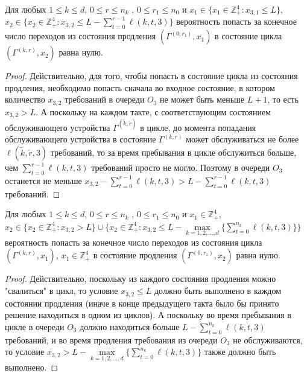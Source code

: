 \documentclass[a4paper,12pt,russian]{extarticle}
\begin{document}
\begin{lemma}
Для любых $1 \leqslant k \leqslant d$, $0 \leqslant r \leqslant n_k$ , $0 \leqslant r_1 \leqslant n_0$ и $x_1 \in \{x_1 \in \mathbb{Z}_+^4 \colon x_{3,1}\leqslant L\}$, $x_2 \in \{x_2 \in \mathbb{Z}_+^4 \colon x_{3,2} \leqslant L -\sum_{t=0}^{r-1} \ell(k,t,3)\}$ вероятность попасть за конечное число переходов из состояния продления $(\Gamma^{(0,r_1)},x_1)$ в состояние цикла $(\Gamma^{(k,r)},x_2)$ равна нулю.
\label{lemma:7}
\end{lemma}
\begin{proof}
Действительно, для того, чтобы попасть в состояние цикла из состояния продления, необходимо попасть сначала во входное состояние, в котором количество $x_{3,2}$ требований в очереди $O_3$ не может быть меньше $L+1$, то есть $x_{3,2} > L$. А поскольку на каждом такте, с соответствующим состоянием обслуживающего устройства $\Gamma^{(\tilde{k},\tilde{r})}$ в цикле, до момента попадания обслуживающего устройства в состояние $\Gamma^{(k,r)}$ может обслуживаться не более $\ell(\tilde{k},\tilde{r}, 3)$ требований, то за время пребывания в цикле обслужиться больше, чем $\sum_{t=0}^{r-1} \ell(k,t,3)$ требований просто не могло. Поэтому в очереди $O_3$ останется не меньше $x_{3,2} -\sum_{t=0}^{r-1} \ell(k,t,3)> L - \sum_{t=0}^{r-1} \ell(k,t,3)$ требований.
\end{proof}

\begin{lemma}
Для любых $1 \leqslant k \leqslant d$, $0 \leqslant r \leqslant n_k$ , $0 \leqslant r_1 \leqslant n_0$ и $x_1 \in \mathbb{Z}_+^4$,  $x_2 \in \{x_2 \in \mathbb{Z}_+^4 \colon x_{3,2} > L \} \cup \{x_2 \in \mathbb{Z}_+^4 \colon x_{3,2} \leqslant L -  \max\limits_{k=1, 2, \ldots, d}\{\sum_{t=0}^{n_k} \ell(k,t,3)\} \} $ вероятность попасть за конечное число переходов из состояния цикла  $(\Gamma^{(k,r)},x_1)$, $x_1 \in \mathbb{Z}_+^4$ в состояние продления $(\Gamma^{(0,r_1)},x_2)$ равна нулю.
\label{lemma:8}
\end{lemma}
\begin{proof}
Действительно, поскольку из каждого состояния продления можно "свалиться" в цикл, то условие $x_{3,2} \leqslant L$ должно быть выполнено в каждом состоянии продления (иначе в конце предыдущего такта было бы принято решение находиться в одном из циклов). А поскольку во время пребывания в цикле в очереди $O_3$ должно находиться больше $L -  \sum_{t=0}^{n_k} \ell(k,t,3)$ требований, и во время продления требования из очереди $O_3$ не обслуживаются, то условие $x_{3,2} > L -  \max\limits_{k=1, 2, \ldots, d}\{\sum_{t=0}^{n_k} \ell(k,t,3)\}$ также должно быть выполнено.
\end{proof}
\end{document}
